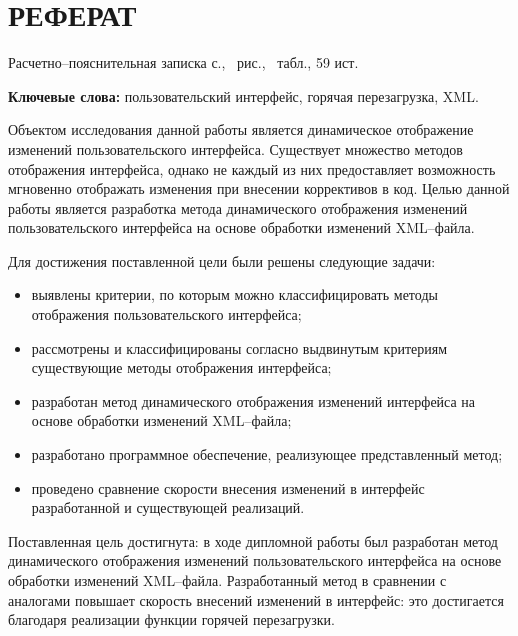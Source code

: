 \section*{РЕФЕРАТ}

Расчетно--пояснительная записка \pageref{LastPage} с., \totalfigures\ рис., \totaltables\ табл., 59 ист.

\textbf{Ключевые слова:} пользовательский интерфейс, горячая перезагрузка, XML.

Объектом исследования данной работы является динамическое отображение изменений пользовательского интерфейса.
Существует множество методов отображения интерфейса, однако не каждый из них предоставляет возможность мгновенно отображать изменения при внесении коррективов в код. 
Целью данной работы является разработка метода динамического отображения изменений пользовательского интерфейса на основе обработки изменений XML--файла.

Для достижения поставленной цели были решены следующие задачи:
\begin{itemize}[label=---]
	\item выявлены критерии, по которым можно классифицировать методы отображения пользовательского интерфейса;
	\item рассмотрены и классифицированы согласно выдвинутым критериям существующие методы отображения интерфейса;
	\item разработан метод динамического отображения изменений интерфейса на основе обработки изменений XML--файла;
	\item разработано программное обеспечение, реализующее представленный метод;
	\item проведено сравнение скорости внесения изменений в интерфейс разработанной и существующей реализаций.
\end{itemize}

Поставленная цель достигнута: в ходе дипломной работы был разработан метод динамического отображения изменений пользовательского интерфейса на основе обработки изменений XML--файла.
Разработанный метод в сравнении с аналогами повышает скорость внесений изменений в интерфейс: это достигается благодаря реализации функции горячей перезагрузки.


\pagebreak